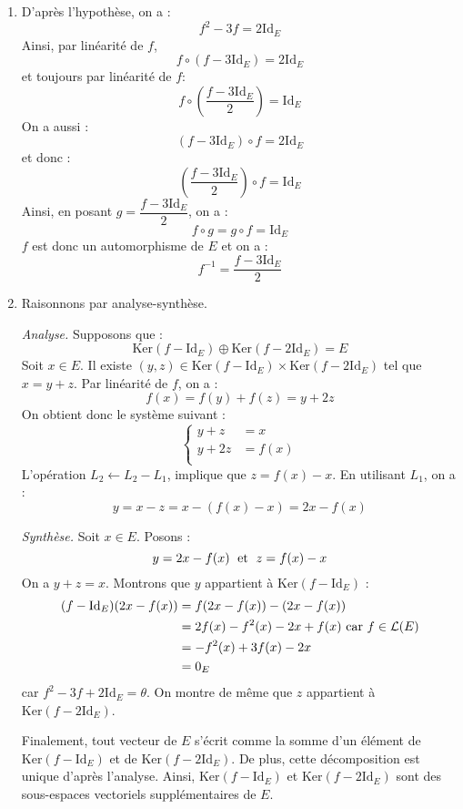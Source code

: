 \documentclass[a4paper,10pt]{report}
\begin{document}
\begin{enumerate}
\item D'après l'hypothèse, on a :
$$ f^2-3f =  2 \textrm{Id}_E$$
Ainsi, par linéarité de $f$,
$$ f \circ (f-3 \textrm{Id}_E) = 2 \textrm{Id}_E$$
et toujours par linéarité de $f$:
$$ f \circ \left( \dfrac{f-3 \textrm{Id}_E}{2} \right) = \textrm{Id}_E$$
On a aussi :
$$ (f- 3 \textrm{Id}_E) \circ f = 2 \textrm{Id}_E$$
et donc :
$$ \left( \dfrac{f-3 \textrm{Id}_E}{2} \right) \circ f = \textrm{Id}_E$$
Ainsi, en posant $g = \dfrac{f-3 \textrm{Id}_E}{2}$, on a :
$$f \circ g = g \circ f = \textrm{Id}_E$$
$f$ est donc un automorphisme de $E$ et on a :
$$ f^{-1} = \dfrac{f-3 \textrm{Id}_E}{2}$$
\item Raisonnons par analyse-synthèse.

\medskip

\noindent \textit{Analyse.} Supposons que :
$$\textrm{Ker}(f - \textrm{Id}_E) \oplus \textrm{Ker}(f - 2\textrm{Id}_E) = E$$
Soit $x \in E$. Il existe $(y,z) \in \textrm{Ker}(f - \textrm{Id}_E) \times \textrm{Ker}(f - 2\textrm{Id}_E)$ tel que $x=y+z$. Par linéarité de $f$, on a :
$$f(x) = f(y) + f(z) = y+2z$$
On obtient donc le système suivant :
$$ \left\lbrace \begin{array}{rl}
 y+z & = x \\
y+2z & = f(x)\\
\end{array}\right.$$
L'opération $L_2 \leftarrow L_2- L_1$, implique que $z = f(x)-x$. En utilisant $L_1$, on a :
$$ y= x-z = x -(f(x)-x)= 2x-f(x)$$

\medskip

\noindent \textit{Synthèse.} Soit $x \in E$. Posons :
$$ y= 2x-f(x) \; \hbox{ et } \; z= f(x)-x$$
On a $y+z=x$. Montrons que $y$ appartient à $\textrm{Ker}(f - \textrm{Id}_E)$ :
\begin{align*}
(f - \textrm{Id}_E)(2x-f(x)) & = f(2x-f(x))- (2x-f(x)) \\
& = 2f(x) -f^2(x)-2x+f(x) \hbox{ car } f \in \mathcal{L}(E) \\
& = - f^2(x) +3f(x) -2x \\
& = 0_E
\end{align*}
car $f^2 - 3f + 2 \textrm{Id}_E = \theta$. On montre de même que $z$ appartient à $\textrm{Ker}(f - 2\textrm{Id}_E)$.

\medskip

\noindent Finalement, tout vecteur de $E$ s'écrit comme la somme d'un élément de $\textrm{Ker}(f - \textrm{Id}_E)$ et de $\textrm{Ker}(f - 2\textrm{Id}_E)$. De plus, cette décomposition est unique d'après l'analyse. Ainsi, $\textrm{Ker}(f - \textrm{Id}_E)$ et $\textrm{Ker}(f - 2\textrm{Id}_E)$ sont des sous-espaces vectoriels supplémentaires de $E$.
\end{enumerate}
\end{document}

